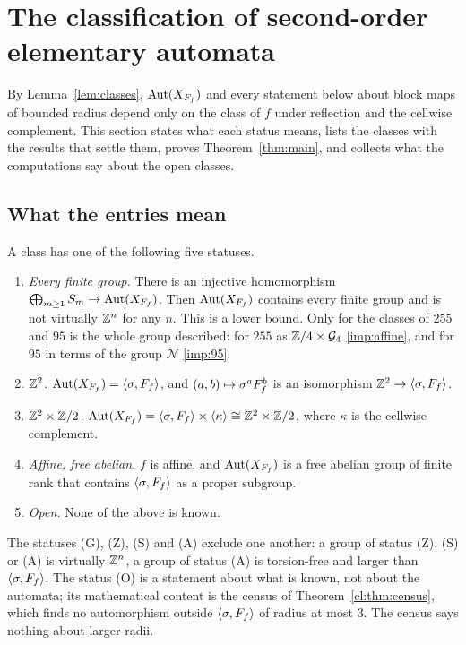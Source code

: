 \section{The classification of second-order elementary automata}\label{sec:classification}

By Lemma~\ref{lem:classes}, $\operatorname{Aut}(X_{F_f})$ and every statement below about block maps of bounded radius depend only on the class of $f$ under reflection and the cellwise complement. This section states what each status means, lists the classes with the results that settle them, proves Theorem~\ref{thm:main}, and collects what the computations say about the open classes.

\subsection{What the entries mean}\label{cl:sec:status}

\begin{definition}\label{cl:def:status}
A class has one of the following five statuses.
\begin{enumerate}
\item[(G)] \emph{Every finite group.} There is an injective homomorphism $\bigoplus_{m\ge1}S_m\to\operatorname{Aut}(X_{F_f})$. Then $\operatorname{Aut}(X_{F_f})$ contains every finite group and is not virtually $\mathbb{Z}^n$ for any $n$. This is a lower bound. Only for the classes of $255$ and $95$ is the whole group described: for $255$ as $\mathbb{Z}/4\times\mathcal G_4$ \eqref{imp:affine}, and for $95$ in terms of the group $\mathcal N$ \eqref{imp:95}.
\item[(Z)] \emph{$\mathbb{Z}^2$.} $\operatorname{Aut}(X_{F_f})=\langle\sigma,F_f\rangle$, and $(a,b)\mapsto\sigma^aF_f^b$ is an isomorphism $\mathbb{Z}^2\to\langle\sigma,F_f\rangle$.
\item[(S)] \emph{$\mathbb{Z}^2\times\mathbb{Z}/2$.} $\operatorname{Aut}(X_{F_f})=\langle\sigma,F_f\rangle\times\langle\kappa\rangle\cong\mathbb{Z}^2\times\mathbb{Z}/2$, where $\kappa$ is the cellwise complement.
\item[(A)] \emph{Affine, free abelian.} $f$ is affine, and $\operatorname{Aut}(X_{F_f})$ is a free abelian group of finite rank that contains $\langle\sigma,F_f\rangle$ as a proper subgroup.
\item[(O)] \emph{Open.} None of the above is known.
\end{enumerate}
\end{definition}

The statuses (G), (Z), (S) and (A) exclude one another: a group of status (Z), (S) or (A) is virtually $\mathbb{Z}^n$, a group of status (A) is torsion-free and larger than $\langle\sigma,F_f\rangle$. The status (O) is a statement about what is known, not about the automata; its mathematical content is the census of Theorem~\ref{cl:thm:census}, which finds no automorphism outside $\langle\sigma,F_f\rangle$ of radius at most $3$. The census says nothing about larger radii.

